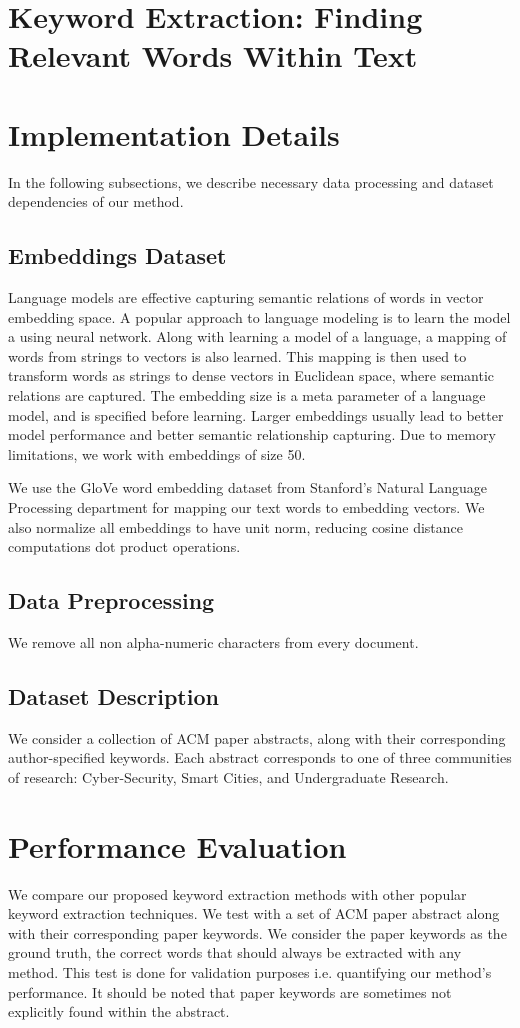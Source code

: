 \documentclass[12pt]{article}
\begin{document}
\section{Keyword Extraction: Finding Relevant Words Within Text}



\section{Implementation Details}
In the following subsections, we describe necessary data processing and dataset dependencies of our method.
\subsection{Embeddings Dataset}
Language models are effective capturing semantic relations of words in vector embedding space. A popular approach to language
modeling is to learn the model a using neural network. Along with learning a model of a language, a mapping of words from strings to vectors is also learned.
This mapping is then used to transform words as strings to dense vectors in Euclidean space, where semantic relations are captured.
The embedding size is a meta parameter of a language model, and is specified before learning. Larger embeddings usually lead to better model performance
and better semantic relationship capturing. Due to memory limitations, we work with embeddings of size 50.

We use the GloVe word embedding dataset from Stanford's Natural Language Processing department for mapping our text words to embedding vectors.
We also normalize all embeddings to have unit norm, reducing cosine distance computations dot product operations.
\subsection{Data Preprocessing}
We remove all non alpha-numeric characters from every document.
\subsection{Dataset Description}
We consider a collection of ACM paper abstracts, along with their corresponding author-specified keywords. Each abstract corresponds to one of three communities of research:
Cyber-Security, Smart Cities, and Undergraduate Research.






\section{Performance Evaluation}
We compare our proposed keyword extraction methods with other popular keyword extraction techniques. We test with a set of ACM paper abstract along with their
corresponding paper keywords.
We consider the paper keywords as the ground truth, the correct words that should always be extracted with any method. This test is done for validation purposes i.e. quantifying
our method's performance. It should be noted that paper keywords are sometimes not explicitly found within the abstract.
\end{document}
